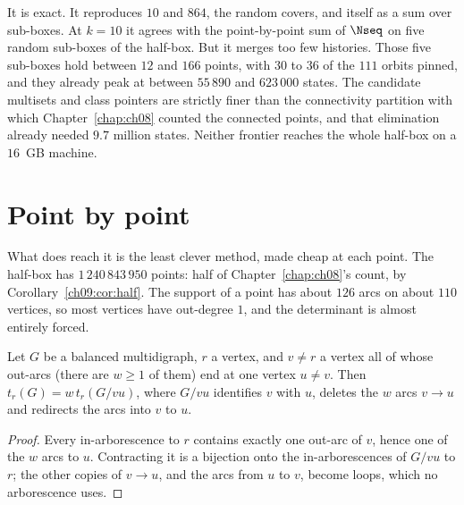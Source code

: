 It is exact. It reproduces $10$ and $864$, the random covers, and itself as a sum over
sub-boxes. At $k=10$ it agrees with the point-by-point sum of $\Nseq$ on five random sub-boxes of
the half-box. But it merges too few histories. Those five sub-boxes hold between $12$ and $166$
points, with $30$ to $36$ of the $111$ orbits pinned, and they already peak at between $55\,890$
and $623\,000$ states. The candidate multisets and class pointers are strictly finer than the
connectivity partition with which Chapter~\ref{chap:ch08} counted the connected points, and that elimination
already needed $9.7$ million states. Neither frontier reaches the whole half-box on a
$16$~GB machine.

\section{Point by point}\label{ch09:sec:points}

What does reach it is the least clever method, made cheap at each point. The half-box has
$1\,240\,843\,950$ points: half of Chapter~\ref{chap:ch08}'s count, by Corollary~\ref{ch09:cor:half}. The support of a
point has about $126$ arcs on about $110$ vertices, so most vertices have out-degree $1$, and
the determinant is almost entirely forced.

\begin{lemma}\label{ch09:lem:forced}
Let $G$ be a balanced multidigraph, $r$ a vertex, and $v\ne r$ a vertex all of whose out-arcs
(there are $w\ge1$ of them) end at one vertex $u\ne v$. Then $t_r(G)=w\,t_r(G/vu)$, where $G/vu$
identifies $v$ with $u$, deletes the $w$ arcs $v\to u$ and redirects the arcs into $v$ to $u$.
\end{lemma}

\begin{proof}
Every in-arborescence to $r$ contains exactly one out-arc of $v$, hence one of the $w$ arcs to
$u$. Contracting it is a bijection onto the in-arborescences of $G/vu$ to $r$; the other copies
of $v\to u$, and the arcs from $u$ to $v$, become loops, which no arborescence uses.
\end{proof}

